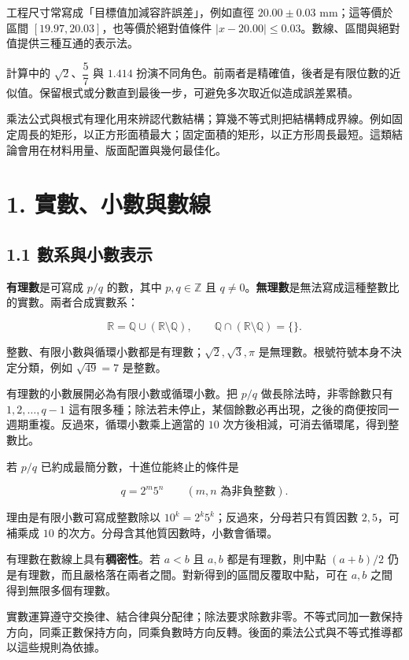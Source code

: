 \documentclass[11pt,a4paper]{article}
\begin{document}
工程尺寸常寫成「目標值加減容許誤差」，例如直徑 \(20.00\pm0.03\) mm；這等價於區間 \([19.97,20.03]\)，也等價於絕對值條件 \(|x-20.00|\le0.03\)。數線、區間與絕對值提供三種互通的表示法。

計算中的 \(\sqrt2\)、\(\dfrac{5}{7}\) 與 \(1.414\) 扮演不同角色。前兩者是精確值，後者是有限位數的近似值。保留根式或分數直到最後一步，可避免多次取近似造成誤差累積。

乘法公式與根式有理化用來辨認代數結構；算幾不等式則把結構轉成界線。例如固定周長的矩形，以正方形面積最大；固定面積的矩形，以正方形周長最短。這類結論會用在材料用量、版面配置與幾何最佳化。

\section{1. 實數、小數與數線}\label{ux5be6ux6578ux5c0fux6578ux8207ux6578ux7dda}

\subsection{1.1 數系與小數表示}\label{ux6578ux7cfbux8207ux5c0fux6578ux8868ux793a}

\textbf{有理數}是可寫成 \(p/q\) 的數，其中 \(p,q\in\mathbb Z\) 且 \(q\ne0\)。\textbf{無理數}是無法寫成這種整數比的實數。兩者合成實數系：

\[
\mathbb R=\mathbb Q\cup(\mathbb R\setminus\mathbb Q),
\qquad
\mathbb Q\cap(\mathbb R\setminus\mathbb Q)=\{\}.
\]

整數、有限小數與循環小數都是有理數；\(\sqrt2,\sqrt3,\pi\) 是無理數。根號符號本身不決定分類，例如 \(\sqrt{49}=7\) 是整數。

有理數的小數展開必為有限小數或循環小數。把 \(p/q\) 做長除法時，非零餘數只有 \(1,2,\ldots,q-1\) 這有限多種；除法若未停止，某個餘數必再出現，之後的商便按同一週期重複。反過來，循環小數乘上適當的 \(10\) 次方後相減，可消去循環尾，得到整數比。

若 \(p/q\) 已約成最簡分數，十進位能終止的條件是

\[
q=2^m5^n\qquad(m,n\text{ 為非負整數}).
\]

理由是有限小數可寫成整數除以 \(10^k=2^k5^k\)；反過來，分母若只有質因數 \(2,5\)，可補乘成 \(10\) 的次方。分母含其他質因數時，小數會循環。

有理數在數線上具有\textbf{稠密性}。若 \(a<b\) 且 \(a,b\) 都是有理數，則中點 \((a+b)/2\) 仍是有理數，而且嚴格落在兩者之間。對新得到的區間反覆取中點，可在 \(a,b\) 之間得到無限多個有理數。

實數運算遵守交換律、結合律與分配律；除法要求除數非零。不等式同加一數保持方向，同乘正數保持方向，同乘負數時方向反轉。後面的乘法公式與不等式推導都以這些規則為依據。
\end{document}
